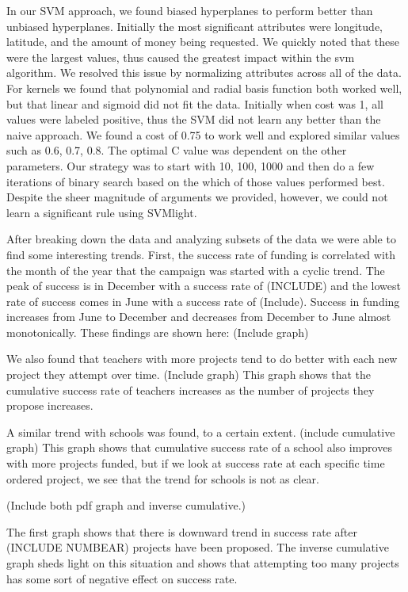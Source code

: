 \documentclass{article}
\begin{document}
In our SVM approach, we found biased hyperplanes to perform better than unbiased hyperplanes. Initially the most significant attributes were longitude, latitude, and the amount of money being requested.  We quickly noted that these were the largest values, thus caused the greatest impact within the svm algorithm. We resolved this issue by normalizing attributes across all of the data. For kernels we found that polynomial and radial basis function both worked well, but that linear and sigmoid did not fit the data. Initially when cost was 1, all values were labeled positive, thus the SVM did not learn any better than the naive approach.  We found a cost of 0.75 to work well and explored similar values such as 0.6, 0.7, 0.8. The optimal C value was dependent on the other parameters.  Our strategy was to start with 10, 100, 1000 and then do a few iterations of binary search based on the which of those values performed best. Despite the sheer magnitude of arguments we provided, however, we could not learn a significant rule using SVMlight.  

After breaking down the data and analyzing subsets of the data we were able to find some interesting trends. First, the success rate of funding is correlated with the month of the year that the campaign was started with a cyclic trend. The peak of success is in December with a success rate of (INCLUDE) and the lowest rate of success comes in June with a success rate of (Include). Success in funding increases from June to December and decreases from December to June almost monotonically. These findings are shown here:
(Include graph)

We also found that teachers with more projects tend to do better with each new project they attempt over time.
(Include graph)
This graph shows that the cumulative success rate of teachers increases as the number of projects they propose increases.

A similar trend with schools was found, to a certain extent.
(include cumulative graph)
This graph shows that cumulative success rate of a school also improves with more projects funded, but if we look at success rate at each specific time ordered project, we see that the trend for schools is not as clear.

(Include both pdf graph and inverse cumulative.)

The first graph shows that there is downward trend in success rate after (INCLUDE NUMBEAR) projects have been proposed. The inverse cumulative graph sheds light on this situation and shows that attempting too many projects has some sort of negative effect on success rate.
\end{document}
